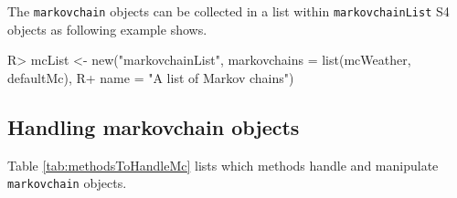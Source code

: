 \documentclass[
  nojss]{jss}
\begin{document}
The \texttt{markovchain} objects can be collected in a list within \texttt{markovchainList} S4 objects as following example shows.

\begin{CodeChunk}

\begin{CodeInput}
R> mcList <- new("markovchainList", markovchains = list(mcWeather, defaultMc), 
R+                name = "A list of Markov chains")
\end{CodeInput}
\end{CodeChunk}

\hypertarget{handling-markovchain-objects}{%
\subsection{Handling markovchain objects}\label{handling-markovchain-objects}}

Table \ref{tab:methodsToHandleMc} lists which methods handle and manipulate \texttt{markovchain} objects.
\end{document}
